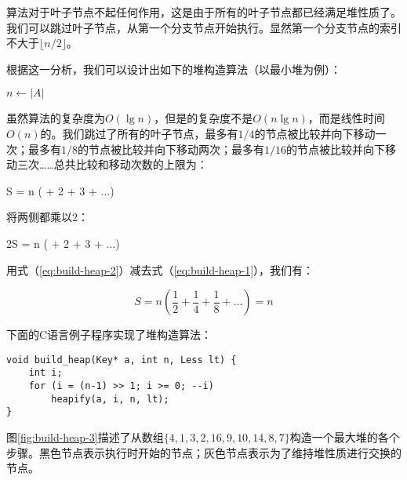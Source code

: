 \documentclass[UTF8]{article}
\begin{document}
算法对于叶子节点不起任何作用，这是由于所有的叶子节点都已经满足堆性质了。我们可以跳过叶子节点，从第一个分支节点开始执行。显然第一个分支节点的索引不大于$\lfloor n/2 \rfloor$。

根据这一分析，我们可以设计出如下的堆构造算法（以最小堆为例）：

\begin{algorithmic}[1]
  \State $n \gets |A|$
    \State {}
  \EndFor
\EndFunction
\end{algorithmic}

虽然算法的复杂度为$O(\lg n)$，但是的复杂度不是$O(n \lg n)$，而是线性时间$O(n)$的。我们跳过了所有的叶子节点，最多有$1/4$的节点被比较并向下移动一次；最多有$1/8$的节点被比较并向下移动两次；最多有$1/16$的节点被比较并向下移动三次……总共比较和移动次数的上限为：

\be
S = n ( + 2  + 3  + ...)
\label{eq:build-heap-1}
\ee

将两侧都乘以2：

\be
2S = n ( + 2  + 3  + ...)
\label{eq:build-heap-2}
\ee

用式（\ref{eq:build-heap-2}）减去式（\ref{eq:build-heap-1}），我们有：

\[
S = n (\frac{1}{2} + \frac{1}{4} + \frac{1}{8} + ...) = n
\]

下面的C语言例子程序实现了堆构造算法：

\lstset{language=C}
\begin{lstlisting}
void build_heap(Key* a, int n, Less lt) {
    int i;
    for (i = (n-1) >> 1; i >= 0; --i)
        heapify(a, i, n, lt);
}
\end{lstlisting}

图\ref{fig:build-heap-3}描述了从数组$\{4, 1, 3, 2, 16, 9, 10, 14, 8, 7\}$构造一个最大堆的各个步骤。黑色节点表示执行时开始的节点；灰色节点表示为了维持堆性质进行交换的节点。
\end{document}
